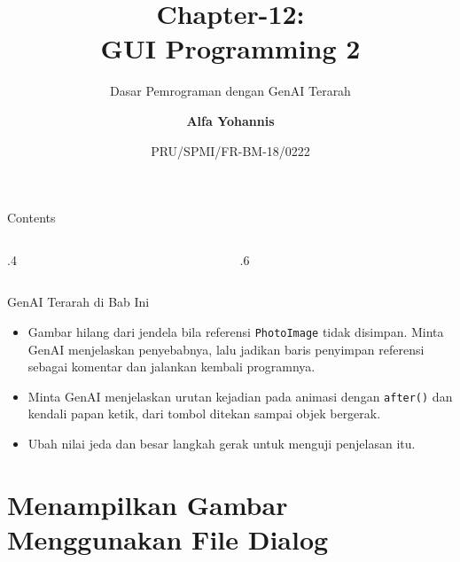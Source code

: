 \documentclass[aspectratio=169, table]{beamer}
\subtitle{Dasar Pemrograman dengan GenAI Terarah}
\title{Chapter-12:\\\LARGE{GUI Programming 2\\}
\vspace{10pt}}
\date[Serial]{\scriptsize {PRU/SPMI/FR-BM-18/0222}}
\author[Pradita]{\small{\textbf{Alfa Yohannis}}}
\begin{document}
\frame{\titlepage}

\begin{frame}[fragile]{Contents}
\vspace{15pt}
\begin{columns}[t]
\begin{column}{.4\textwidth}
\tableofcontents[sections={1-4}]
\end{column}
\begin{column}{.6\textwidth}
\tableofcontents[sections={5-8}]
\end{column}
\end{columns}
\end{frame}


\begin{frame}{GenAI Terarah di Bab Ini}
\small
\begin{itemize}
  \item Gambar hilang dari jendela bila referensi \texttt{PhotoImage} tidak disimpan. Minta GenAI menjelaskan penyebabnya, lalu jadikan baris penyimpan referensi sebagai komentar dan jalankan kembali programnya.
  \item Minta GenAI menjelaskan urutan kejadian pada animasi dengan \texttt{after()} dan kendali papan ketik, dari tombol ditekan sampai objek bergerak.
  \item Ubah nilai jeda dan besar langkah gerak untuk menguji penjelasan itu.
\end{itemize}
\end{frame}

\section{Menampilkan Gambar Menggunakan File Dialog}
\end{document}
